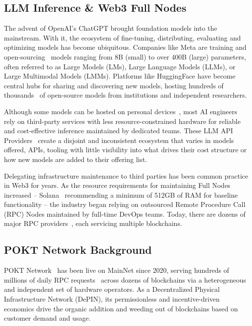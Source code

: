 \documentclass[conference,compsoc]{IEEEtran}
\begin{document}
\subsection{ LLM Inference \& Web3 Full Nodes}
The advent of OpenAI’s ChatGPT brought foundation models into the mainstream. With it, the ecosystem of fine-tuning, distributing, evaluating and optimizing models has become ubiquitous. Companies like Meta are training and open-sourcing~\cite{metaIntroducingMeta} models ranging from 8B (small) to over 400B (large) parameters, often referred to as Large Models (LMs), Large Language Models (LLMs), or Large Multimodal Models (LMMs). Platforms like HuggingFace have become central hubs for sharing and discovering new models, hosting hundreds of thousands~\cite{greataipromptsEveryHugging} of open-source models from institutions and independent researchers.

Although some models can be hosted on personal devices~\cite{pytorchExecuTorchAlpha}, most AI engineers~\cite{latentRiseEngineer} rely on third-party services with less resource-constrained hardware for reliable and cost-effective inference maintained by dedicated teams. These LLM API Providers~\cite{artificialanalysisProviderLeaderboard} create a disjoint and inconsistent ecosystem that varies in models offered, APIs, tooling with little visibility into what drives their cost structure or how new models are added to their offering list.

Delegating infrastructure maintenance to third parties has been common practice in Web3 for years. As the resource requirements for maintaining Full Nodes~\cite{bitcoinRunningFull} increased – Solana~\cite{solanalabsSolanaValidator} recommending a minimum of 512GB of RAM for baseline functionality – the industry began relying on outsourced Remote Procedure Call (RPC) Nodes maintained by full-time DevOps teams. Today, there are dozens of major RPC providers~\cite{rpclistRPCListFind}, each servicing multiple blockchains.

\subsection{POKT Network Background}

POKT Network~\cite{poktWeb3Infrastructure} has been live on MainNet since 2020, serving hundreds of millions of daily RPC requests~\cite{poktscan} across dozens of blockchains via a heterogeneous and independent set of hardware operators. As a Decentralized Physical Infrastructure Network (DePIN), its permissionless and incentive-driven economics drive the organic addition and weeding out of blockchains based on customer demand and usage.
\end{document}
